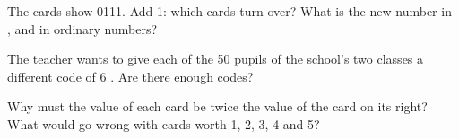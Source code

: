 \begin{exercise}[$\star\star$]\label{exo:g5:bits-and-bytes:9}
The cards show 0111. Add 1: which cards turn over? What is the new number in
, and in ordinary numbers?
\end{exercise}

\begin{exercise}[$\star\star$]\label{exo:g5:bits-and-bytes:10}
The teacher wants to give each of the 50 pupils of the school's two classes a
different code of 6 . Are there enough codes?
\end{exercise}

\begin{exercise}[$\star\star$]\label{exo:g5:bits-and-bytes:11}
Why must the value of each card be twice the value of the card on its right?
What would go wrong with cards worth 1, 2, 3, 4 and 5?
\end{exercise}
